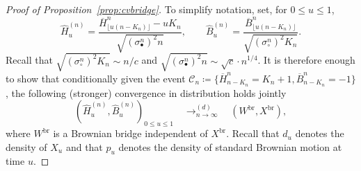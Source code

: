 \documentclass[AHL,XML,longabstracts,Unicode]{cedram}
\def\scn{\sigma_{\circ}^{n}}
\def\sbn{\sigma_{\bullet}^{n}}
\def\oB{\overline{B}}
\def\hB{\widehat{B}}
\def\oH{\overline{H}}
\def\hH{\widehat{H}}
\def \Xbr{X^{\mathrm{br}}}
\begin{document}
\begin{proof}[Proof of Proposition~\ref{prop:cvbridge}] To simplify notation, set, for $0 \leq u \leq 1$,
\[\hH^{(n)}_{u}= \frac{\oH^{n}_{ \lfloor u (n-K_{n}) \rfloor } - u K_{n} }{\sqrt{ (\sbn)^{2} n} }, \qquad \hB^{(n)}_{u}= \frac{\oB^{n}_{\lfloor u (n-K_{n}) \rfloor}}{ \sqrt{ (\scn)^{2} K_{n} }} .\]
Recall that $\sqrt{ (\scn)^{2} K_{n}} \sim {n}/{c}$ and $\sqrt{ (\sbn)^{2} n} \sim \sqrt{c}\cdot n^{1/4}$.
It is therefore enough to show that conditionally given the event
$ \mathcal{C}_{n} \coloneqq \{\oH^{n}_{n-K_{n}}=K_{n}+1, \oB^{n}_{n-K_{n}}=-1 \}$,
the following (stronger) convergence in distribution holds jointly
\[  \left(  \hH^{(n)}_{u},  \hB^{(n)}_{u} \right)_{0 \leq u \leq 1}  \quad \mathop{\longrightarrow}^{(d)}_{n \rightarrow \infty} \quad (W^{\mathrm{br}},\Xbr),\]
where $ W^{\mathrm{br}}$ is a Brownian bridge independent of $\Xbr$.  Recall that $d_{u}$ denotes the density of $X_{u}$ and that $p_{u}$ denotes the density of standard Brownian motion at time $u$.





\end{proof}
\end{document}
